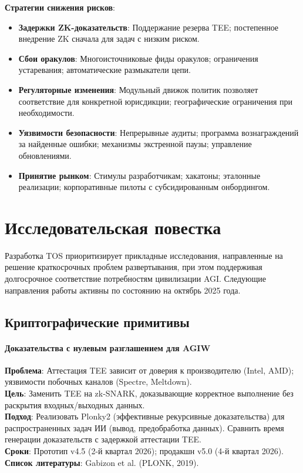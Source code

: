 \documentclass[11pt]{article}
\begin{document}
\textbf{Стратегии снижения рисков}:
\begin{itemize}[noitemsep]
  \item \textbf{Задержки ZK-доказательств}: Поддержание резерва TEE; постепенное внедрение ZK сначала для задач с низким риском.
  \item \textbf{Сбои оракулов}: Многоисточниковые фиды оракулов; ограничения устаревания; автоматические размыкатели цепи.
  \item \textbf{Регуляторные изменения}: Модульный движок политик позволяет соответствие для конкретной юрисдикции; географические ограничения при необходимости.
  \item \textbf{Уязвимости безопасности}: Непрерывные аудиты; программа вознаграждений за найденные ошибки; механизмы экстренной паузы; управление обновлениями.
  \item \textbf{Принятие рынком}: Стимулы разработчикам; хакатоны; эталонные реализации; корпоративные пилоты с субсидированным онбордингом.
\end{itemize}

\section{Исследовательская повестка}
\label{sec:research}

Разработка TOS приоритизирует прикладные исследования, направленные на решение краткосрочных проблем развертывания, при этом поддерживая долгосрочное соответствие потребностям цивилизации AGI. Следующие направления работы активны по состоянию на октябрь 2025 года.

\subsection{Криптографические примитивы}

\paragraph{Доказательства с нулевым разглашением для AGIW}
\textbf{Проблема}: Аттестация TEE зависит от доверия к производителю (Intel, AMD); уязвимости побочных каналов (Spectre, Meltdown).\\
\textbf{Цель}: Заменить TEE на zk-SNARK, доказывающие корректное выполнение без раскрытия входных/выходных данных.\\
\textbf{Подход}: Реализовать Plonky2 (эффективные рекурсивные доказательства) для распространенных задач ИИ (вывод, предобработка данных). Сравнить время генерации доказательств с задержкой аттестации TEE.\\
\textbf{Сроки}: Прототип v4.5 (2-й квартал 2026); продакшн v5.0 (4-й квартал 2026).\\
\textbf{Список литературы}: Gabizon et al. (PLONK, 2019).
\end{document}

